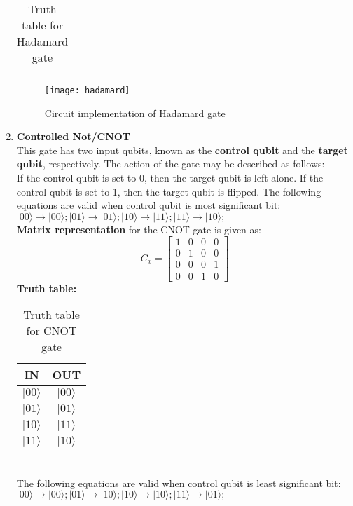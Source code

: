 \documentclass[12pt]{report}
\begin{document}
\begin{enumerate}
\begin{table}[h!]
\begin{tabular}{|c|c|}
\hline
\end{tabular}
\caption{Truth table for Hadamard gate} 
\end{table}
\begin{figure}[h]
\centering
\texttt{[image: hadamard]}
\caption{Circuit implementation of Hadamard gate}
\label{fig:hadamard}
\end{figure}
\item \textbf{Controlled Not/CNOT}\\
This gate has two input qubits, known as the \textbf{control qubit} and the \textbf{target qubit}, respectively. The action of the gate may be described as follows: \\
If the control qubit is set to 0, then the target qubit is left alone. If the control qubit is set to 1, then the target qubit is flipped. The following equations are valid when control qubit is most significant bit:\\
$|00\rangle \to |00\rangle; |01\rangle \to |01\rangle; |10\rangle \to |11\rangle; |11\rangle \to |10\rangle;$\\
\textbf{Matrix representation} for the CNOT gate is given as:
\begin{equation*}
C_x = 
\begin{bmatrix} 
1& 0 & 0& 0\\ 
0& 1 & 0& 0\\
0& 0 & 0& 1\\
0& 0 & 1& 0
\end{bmatrix}
\end{equation*}
\textbf{Truth table:}\\
\begin{table}[h!]
\centering
\begin{tabular}{|c|c|}
\hline
IN & OUT\\
\hline
$|00\rangle$ & $|00\rangle$\\
\hline
$|01\rangle$ & $|01\rangle$\\
\hline
$|10\rangle$ & $|11\rangle$\\
\hline
$|11\rangle$ & $|10\rangle$\\
\hline
\end{tabular}
\caption{Truth table for CNOT gate} 
\end{table}
\\
The following equations are valid when control qubit is least significant bit:\\
$|00\rangle \to |00\rangle; |01\rangle \to |10\rangle; |10\rangle \to |10\rangle; |11\rangle \to |01\rangle;$\\

\end{enumerate}
\end{document}
